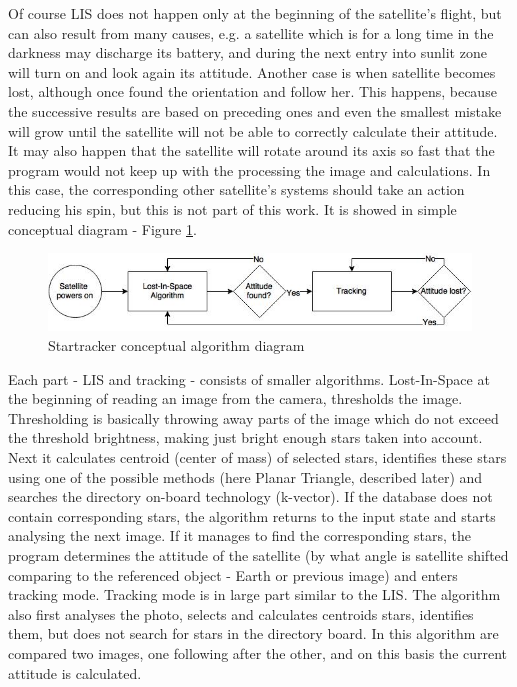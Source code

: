 \documentclass[12pt,a4paper,oneside]{article}
\begin{document}
Of course LIS does not happen only at the beginning of the satellite's flight, but can also result from many causes, e.g. a satellite which is for a long time in the darkness may discharge its battery, and during the next entry into sunlit zone will turn on and look again its attitude. Another case is when satellite becomes lost, although once found the orientation and follow her. This happens, because the successive results are based on preceding ones and even the smallest mistake will grow until the satellite will not be able to correctly calculate their attitude. It may also happen that the satellite will rotate around its axis so fast that the program would not keep up with the processing the image and calculations. In this case, the corresponding other satellite's systems should take an action reducing his spin, but this is not part of this work. It is showed in simple conceptual diagram - Figure \ref{fig:startracker_conceptual_alg}.

\begin{figure}[ht]
\includegraphics[scale=0.59]{startracker_eng.jpg}
\centering
\caption{Startracker conceptual algorithm diagram}
\label{fig:startracker_conceptual_alg}
\end{figure}

Each part - LIS and tracking - consists of smaller algorithms. Lost-In-Space at the beginning of reading an image from the camera, thresholds the image. Thresholding is basically throwing away parts of the image which do not exceed the threshold brightness, making just bright enough stars taken into account. Next it calculates centroid (center of mass) of selected stars, identifies these stars using one of the possible methods (here Planar Triangle, described later) and searches the directory on-board technology (k-vector).
If the database does not contain corresponding stars, the algorithm returns to the input state and starts analysing the next image. If it manages to find the corresponding stars, the program determines the attitude of the satellite (by what angle is satellite shifted comparing to the referenced object - Earth or previous image) and enters tracking mode. Tracking mode is in large part similar to the LIS. The algorithm also first analyses the photo, selects and calculates centroids stars, identifies them, but does not search for stars in the directory board. In this algorithm are compared two images, one following after the other, and on this basis the current attitude is calculated.
\end{document}
